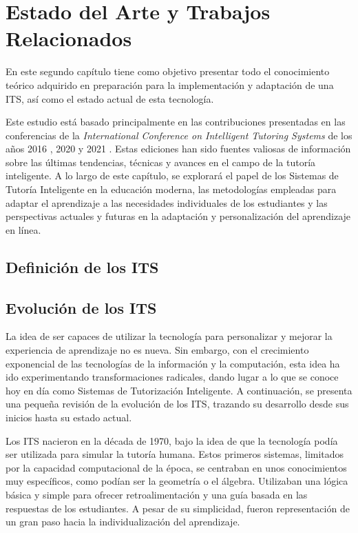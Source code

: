\chapter{Estado del Arte y Trabajos Relacionados} \label{chap:state_of_the_art}

En este segundo capítulo tiene como objetivo presentar todo el conocimiento
teórico adquirido en preparación para la implementación y adaptación de una
ITS, así como el estado actual de esta tecnología.

Este estudio está basado principalmente en las contribuciones presentadas en las conferencias de la \textit{International Conference on Intelligent Tutoring Systems} de los años 2016 \cite{ITS2016}, 2020 \cite{ITS2020} y 2021 \cite{ITS2021}. Estas ediciones han sido fuentes valiosas de información sobre las últimas tendencias, técnicas y avances en el campo de la tutoría inteligente. A lo largo de este capítulo, se explorará el papel de los Sistemas de Tutoría Inteligente en la educación moderna, las metodologías empleadas para adaptar el aprendizaje a las necesidades individuales de los estudiantes y las perspectivas actuales y futuras en la adaptación y personalización del aprendizaje en línea.

\section{Definición de los ITS}

\section{Evolución de los ITS}

La idea de ser capaces de utilizar la tecnología para personalizar y mejorar la experiencia de aprendizaje no es nueva. Sin embargo, con el crecimiento exponencial de las tecnologías de la información y la computación, esta idea ha ido experimentando transformaciones radicales, dando lugar a lo que se conoce hoy en día como Sistemas de Tutorización Inteligente. A continuación, se presenta una pequeña revisión de la evolución de los ITS, trazando su desarrollo desde sus inicios hasta su estado actual.

Los ITS nacieron en la década de 1970, bajo la idea de que la tecnología podía ser utilizada para simular la tutoría humana. Estos primeros sistemas, limitados por la capacidad computacional de la época, se centraban en unos conocimientos muy específicos, como podían ser la geometría o el álgebra. Utilizaban una lógica básica y simple para ofrecer retroalimentación y una guía basada en las respuestas de los estudiantes. A pesar de su simplicidad, fueron representación de un gran paso hacia la individualización del aprendizaje.

